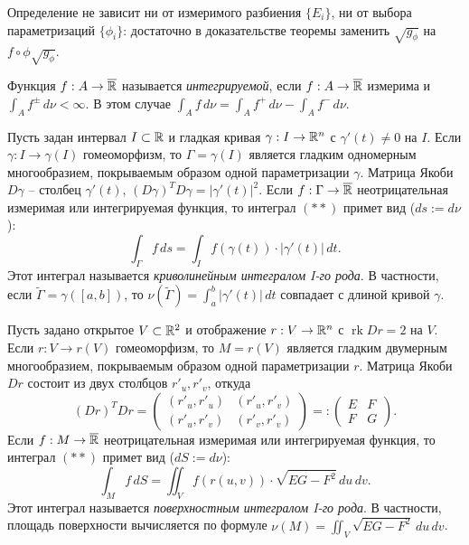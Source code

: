 \begin{note}
	Определение не зависит ни от измеримого разбиения $\{E_i\}$, ни от выбора параметризаций $\{\phi_i\}$:
	достаточно в доказательстве теоремы заменить $\sqrt{g_{\phi}}$ на $f \circ \phi \sqrt{g_{\phi}}$.
\end{note}

\begin{definition}
	Функция $f : A \to \overline{\mathbb{R}}$ называется \textit{интегрируемой}, если $f : A \to \overline{\mathbb{R}}$ измерима и $\int_{A} f^{\pm} \, d \nu < \infty$. 
	В этом случае $\int_A f \, d \nu = \int_A f^+ \, d \nu - \int_A f^- \, d \nu$.
\end{definition}

\begin{example}
	Пусть задан интервал $I \subset \mathbb{R}$ и гладкая кривая $\gamma : I \to \mathbb{R}^n$ с $\gamma'(t) \neq 0$ на $I$. 
	Если $\gamma : I \to \gamma(I)$ гомеоморфизм, то $\Gamma = \gamma(I)$ является гладким одномерным многообразием, покрываемым образом одной параметризации $\gamma$.
	Матрица Якоби $D \gamma$ -- столбец $\gamma'(t)$, $(D \gamma)^T D \gamma = |\gamma'(t)|^2$.
	Если $f : \Gamma \to \overline{\mathbb{R}}$ неотрицательная измеримая или интегрируемая функция, то интеграл $(**)$ примет вид ($ds := d\nu$):
	\[ \int_{\Gamma} f \, ds = \int_{I} f(\gamma(t)) \cdot |\gamma'(t)| \, dt. \]
	Этот интеграл называется \textit{криволинейным интегралом I-го рода}.
	В частности, если $\widetilde{\Gamma} = \gamma([a, b])$, то $\nu(\widetilde{\Gamma}) = \int_a^b |\gamma'(t)| \, dt$ совпадает с длиной кривой $\gamma$.
\end{example}

\begin{example}
	Пусть задано открытое $V \subset \mathbb{R}^2$ и отображение $r : V \to \mathbb{R}^n$ с $\operatorname{rk} Dr = 2$ на $V$. 
	Если $r : V \to r(V)$ гомеоморфизм, то $M = r(V)$ является гладким двумерным многообразием, покрываемым образом одной параметризации $r$. Матрица Якоби $Dr$ состоит из двух столбцов $r'_u, r'_v$, откуда
	\[ (Dr)^T Dr = \begin{pmatrix}
		(r'_u, r'_u) & (r'_u, r'_v) \\ 
		(r'_u, r'_v) & (r'_v, r'_v)
	\end{pmatrix} =: \begin{pmatrix}
		E & F \\ 
		F & G 
	\end{pmatrix}. \]
	Если $f : M \to \overline{\mathbb{R}}$ неотрицательная измеримая или интегрируемая функция, то интеграл $(**)$ примет вид ($dS := d\nu$):
	\[ \int_{M} f \, dS = \iint_{V} f(r(u, v)) \cdot \sqrt{EG - F^2} \, du \, dv. \]
	Этот интеграл называется \textit{поверхностным интегралом I-го рода}.
	В частности, площадь поверхности вычисляется по формуле $\nu(M) = \iint_V \sqrt{EG - F^2} \, du \, dv$.
\end{example}

